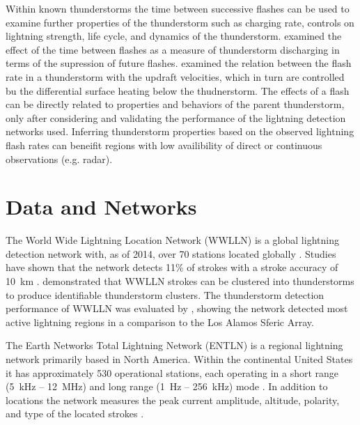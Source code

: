 Within known thunderstorms the time between successive flashes can be used to examine further properties of the thunderstorm such as charging rate, controls on lightning strength, life cycle, and dynamics of the thunderstorm.
\citet{Zoghzoghy2013} examined the effect of the time between flashes as a measure of thunderstorm discharging in terms of the supression of future flashes.
\citet{Zipser1994} examined the relation between the flash rate in a thunderstorm with the updraft velocities, which in turn are controlled bu the differential surface heating below the thudnerstorm.
The effects of a flash can be directly related to properties and behaviors of the parent thunderstorm, only after considering and validating the performance of the lightning detection networks used.
Inferring thunderstorm properties based on the observed lightning flash rates can beneifit regions with low availibility of direct or continuous observations (e.g. radar).

\section{Data and Networks}

The World Wide Lightning Location Network (WWLLN) is a global lightning detection network with, as of 2014, over 70 stations located globally \citep{Rodger2006, Rodger2009}.
Studies have shown that the network detects 11\% of strokes \citep{Rudlosky2013} with a stroke accuracy of 10~km \citep{Abarca2010, Hutchins2012a}.
\citet{Hutchins2014} demonstrated that WWLLN strokes can be clustered into thunderstorms to produce identifiable thunderstorm clusters.
The thunderstorm detection performance of WWLLN was evaluated by \citet{Jacobson2006c}, showing the network detected most active lightning regions in a comparison to the Los Alamos Sferic Array.


The Earth Networks Total Lightning Network (ENTLN) is a regional lightning network primarily based in North America.
Within the continental United States it has approximately 530 operational stations, each operating in a short range (5~kHz -- 12~MHz) and long range (1~Hz -- 256~kHz) mode \citep{Heckman2010}.
In addition to locations the network measures the peak current amplitude, altitude, polarity, and type of the located strokes \citep{Liu2011a}.


